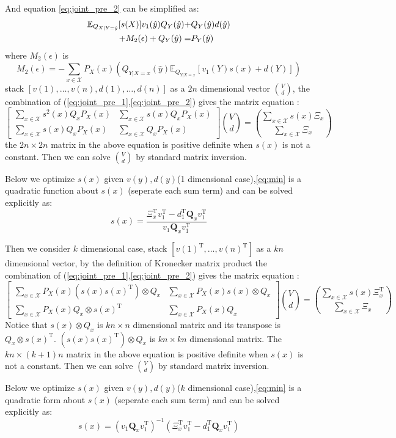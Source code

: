 \documentclass{article}
\def\T{\mathrm{T}}
\def\E{\mathbb{E}}
\begin{document}
And equation \eqref{eq:joint_pre_2} can be simplified as:
\begin{align}\notag
\E_{Q_{X|Y=\hat{y}}}[s(X)]v_1(\hat{y})Q_Y(\hat{y})+&Q_Y(\hat{y})d(\hat{y}) \\
+M_2(\epsilon)+Q_Y(\hat{y})=& P_Y(\hat{y})\label{eq:joint_simplify_2}
\end{align}
where $M_2(\epsilon)$ is
$$
M_2(\epsilon)=-\sum_{x\in \mathcal{X}}P_X(x)\left(Q_{Y|X=x}(\hat{y})\E_{Q_{Y|X=x}}[v_1(Y)s(x)+d(Y)]\right)
$$
stack $[v(1),\dots,v(n),d(1),\dots,d(n)]$ as a $2n$ dimensional vector $\binom{V}{d}$, the combination of (\ref{eq:joint_pre_1},\ref{eq:joint_pre_2}) gives
the matrix equation :
\begin{equation}
\begin{bmatrix}
\sum_{x\in \mathcal{X}} s^2(x)Q_xP_X(x) & \sum_{x\in \mathcal{X}} s(x)Q_xP_X(x) \\
\sum_{x\in \mathcal{X}} s(x)Q_xP_X(x) & \sum_{x\in \mathcal{X}} Q_xP_X(x)
\end{bmatrix}\binom{V}{d}=\binom{\sum_{x\in \mathcal{X}}s(x)\Xi_x}{\sum_{x\in \mathcal{X}}\Xi_x}
\end{equation}
the $2n\times 2n$ matrix in the above equation is positive definite when $s(x)$ is not a constant. Then we can solve $\binom{V}{d}$ by standard matrix inversion.

Below we optimize $s(x)$ given $v(y),d(y)$(1 dimensional case),\eqref{eq:min} is a quadratic function about $s(x)$ (seperate each sum term) and can be solved
explicitly as:
\begin{equation}
s(x)=\frac{\Xi_x^\T v_1^\T -d_1^\T \bm{Q}_x v_1^\T}{v_1\bm{Q}_xv_1^\T}
\end{equation}

Then we consider $k$ dimensional case, stack $[v(1)^\T,\dots,v(n)^\T]$ as a $kn$ dimensional vector, by the definition of Kronecker matrix product 
the combination of (\ref{eq:joint_pre_1},\ref{eq:joint_pre_2}) gives
the matrix equation :
\begin{equation}
\begin{bmatrix}
\sum_{x\in \mathcal{X}} P_X(x) (s(x)s(x)^\T)\otimes Q_x & \sum_{x\in \mathcal{X}} P_X(x) s(x)\otimes Q_x \\
\sum_{x\in \mathcal{X}} P_X(x) Q_x\otimes s(x)^\T & \sum_{x\in \mathcal{X}} P_X(x)Q_x
\end{bmatrix}\binom{V}{d}=\binom{\sum_{x\in \mathcal{X}}s(x)\Xi_x^\T}{\sum_{x\in \mathcal{X}}\Xi_x}
\end{equation}
Notice that $s(x)\otimes Q_x$ is $kn\times n$ dimensional matrix and its transpose is $Q_x \otimes s(x)^\T$.
$(s(x)s(x)^\T)\otimes Q_x$ is $kn \times kn$ dimensional matrix.
The $kn\times (k+1)n$ matrix in the above equation is positive definite when $s(x)$ is not a constant. Then we can solve $\binom{V}{d}$ by standard matrix inversion.

Below we optimize $s(x)$ given $v(y),d(y)$($k$ dimensional case),\eqref{eq:min} is a quadratic form about $s(x)$ (seperate each sum term) and can be solved
explicitly as:
\begin{equation}
s(x)=(v_1\bm{Q}_xv_1^\T)^{-1}(\Xi_x^\T v_1^\T -d_1^\T \bm{Q}_x v_1^\T)
\end{equation}
\end{document}
